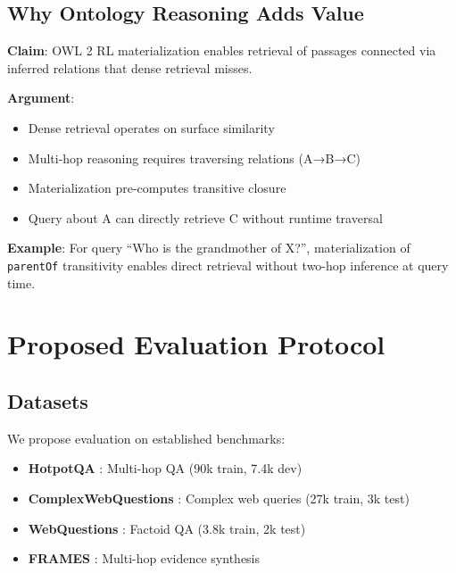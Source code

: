 \documentclass[10pt,twocolumn]{article}
\begin{document}
\subsection{Why Ontology Reasoning Adds Value}

\textbf{Claim}: OWL 2 RL materialization enables retrieval of passages connected via inferred relations that dense retrieval misses.

\textbf{Argument}:
\begin{itemize}
    \item Dense retrieval operates on surface similarity
    \item Multi-hop reasoning requires traversing relations (A→B→C)
    \item Materialization pre-computes transitive closure
    \item Query about A can directly retrieve C without runtime traversal
\end{itemize}

\textbf{Example}: For query ``Who is the grandmother of X?'', materialization of \texttt{parentOf} transitivity enables direct retrieval without two-hop inference at query time.

\section{Proposed Evaluation Protocol}
\label{sec:evaluation}

\subsection{Datasets}

We propose evaluation on established benchmarks:

\begin{itemize}
    \item \textbf{HotpotQA} \cite{yang2018hotpotqa}: Multi-hop QA (90k train, 7.4k dev)
    \item \textbf{ComplexWebQuestions} \cite{talmor2018complexwebq}: Complex web queries (27k train, 3k test)
    \item \textbf{WebQuestions} \cite{berant2013webquestions}: Factoid QA (3.8k train, 2k test)
    \item \textbf{FRAMES} \cite{krishna2024frames}: Multi-hop evidence synthesis
\end{itemize}
\end{document}

